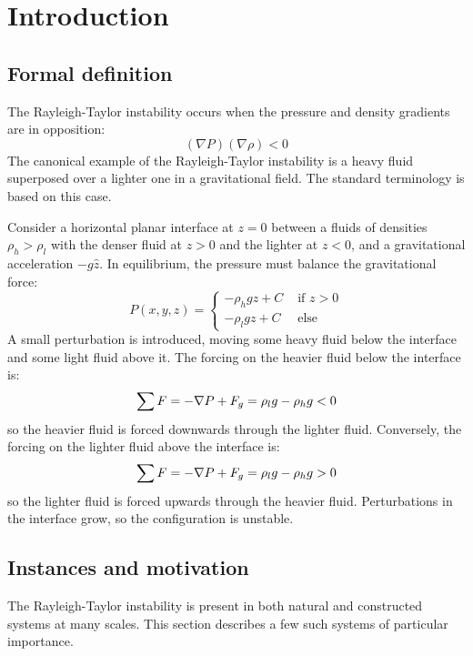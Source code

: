 \chapter{Introduction}

\section{Formal definition}
The Rayleigh-Taylor instability occurs when the pressure and density gradients are in opposition:
\begin{equation}
(\nabla P)(\nabla \rho) < 0
\end{equation}
The canonical example of the Rayleigh-Taylor instability is a heavy fluid superposed over a lighter one in a gravitational field.
The standard terminology is based on this case.

Consider a horizontal planar interface at $z=0$ between a fluids of densities $\rho_h > \rho_l$ with the denser fluid at $z > 0$ and the lighter at $z < 0$, and a gravitational acceleration $-g \hat{z}$.
In equilibrium, the pressure must balance the gravitational force:
\begin{equation}
P(x,y,z) = \begin{cases}- \rho_h g z + C& \text{ if } z > 0 \\
                        - \rho_l g z + C& \text{ else}
           \end{cases}
\end{equation}
A small perturbation is introduced, moving some heavy fluid below the interface and some light fluid above it.
The forcing on the heavier fluid below the interface is:
\begin{equation}\elabel{force1}
\sum F = - \nabla P + F_g = \rho_l g  - \rho_h g < 0
\end{equation}
so the heavier fluid is forced downwards through the lighter fluid.
Conversely, the forcing on the lighter fluid above the interface is:
\begin{equation} \elabel{force2}
\sum F = - \nabla P + F_g = \rho_l g  - \rho_h g > 0
\end{equation}
so the lighter fluid is forced upwards through the heavier fluid.
Perturbations in the interface grow, so the configuration is unstable.

\section{Instances and motivation}
The Rayleigh-Taylor instability is present in both natural and constructed systems at many scales.
This section describes a few such systems of particular importance.

